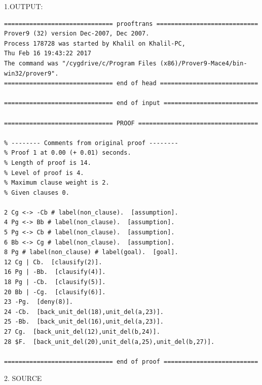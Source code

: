 \documentclass[fullpage]{article}
\begin{document}
1.OUTPUT:

 {\footnotesize \begin{verbatim}
============================== prooftrans ============================
Prover9 (32) version Dec-2007, Dec 2007.
Process 178728 was started by Khalil on Khalil-PC,
Thu Feb 16 19:43:22 2017
The command was "/cygdrive/c/Program Files (x86)/Prover9-Mace4/bin-win32/prover9".
============================== end of head ===========================

============================== end of input ==========================

============================== PROOF =================================

% -------- Comments from original proof --------
% Proof 1 at 0.00 (+ 0.01) seconds.
% Length of proof is 14.
% Level of proof is 4.
% Maximum clause weight is 2.
% Given clauses 0.

2 Cg <-> -Cb # label(non_clause).  [assumption].
4 Pg <-> Bb # label(non_clause).  [assumption].
5 Pg <-> Cb # label(non_clause).  [assumption].
6 Bb <-> Cg # label(non_clause).  [assumption].
8 Pg # label(non_clause) # label(goal).  [goal].
12 Cg | Cb.  [clausify(2)].
16 Pg | -Bb.  [clausify(4)].
18 Pg | -Cb.  [clausify(5)].
20 Bb | -Cg.  [clausify(6)].
23 -Pg.  [deny(8)].
24 -Cb.  [back_unit_del(18),unit_del(a,23)].
25 -Bb.  [back_unit_del(16),unit_del(a,23)].
27 Cg.  [back_unit_del(12),unit_del(b,24)].
28 $F.  [back_unit_del(20),unit_del(a,25),unit_del(b,27)].

============================== end of proof ==========================

\end{verbatim} }

2. SOURCE
\end{document}
